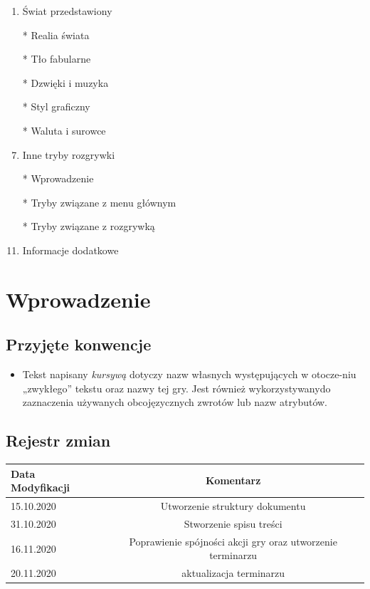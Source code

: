 \documentclass{article}
\begin{document}
\begin{enumerate}
	\item Świat przedstawiony   
	    \item[*] Realia świata  
	    \item[*] Tło fabularne 
	    \item[*] Dzwięki i muzyka
        \item[*] Styl graficzny
	    \item[*] Waluta i surowce
	    
	    
	    
    \item  Inne tryby rozgrywki 
        \item[*] Wprowadzenie
	    \item[*] Tryby związane z menu głównym 
	    \item[*] Tryby związane z rozgrywką 

	\item  Informacje dodatkowe
	   
	\end{enumerate}
	
	
	
	
	
	\newpage
	
	
	
	
\section{Wprowadzenie}
    \subsection{Przyjęte konwencje}
\begin{itemize}
    \item Tekst napisany \emph{kursywą} dotyczy nazw własnych występujących w otocze-niu „zwykłego” tekstu oraz nazwy tej gry. Jest również wykorzystywanydo zaznaczenia używanych obcojęzycznych zwrotów lub nazw atrybutów.
\end{itemize}
    \subsection{Rejestr zmian}
\begin{tabular}{|l|c|}
	\hline
	Data Modyfikacji & Komentarz\\
	\hline
	15.10.2020  & Utworzenie struktury dokumentu\\
	\hline
	31.10.2020  & Stworzenie spisu treści \\
	\hline
    16.11.2020  & Poprawienie spójności akcji gry oraz utworzenie terminarzu\\
	\hline
	20.11.2020  & aktualizacja terminarzu\\
	\hline
	
\end{tabular}
\end{document}
